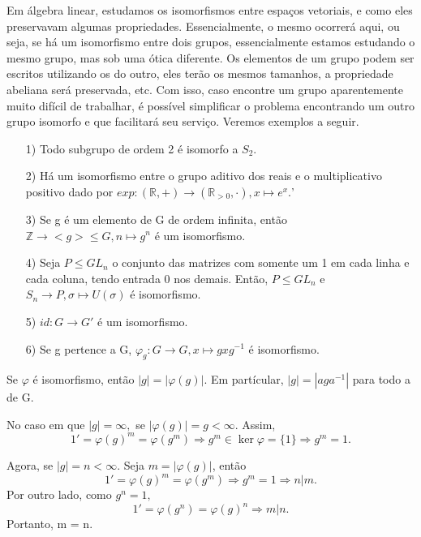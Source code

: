 \documentclass[algebra_notes.tex]{subfiles}
\begin{document}
Em álgebra linear, estudamos os isomorfismos entre espaços vetoriais, e como eles preservavam algumas propriedades. Essencialmente,
o mesmo ocorrerá aqui, ou seja, se há um isomorfismo entre dois grupos, essencialmente estamos estudando o mesmo grupo, mas sob uma ótica diferente.
Os elementos de um grupo podem ser escritos utilizando os do outro, eles terão os mesmos tamanhos, a propriedade abeliana será preservada, etc.
Com isso, caso encontre um grupo aparentemente muito difícil de trabalhar, é possível simplificar o problema encontrando um outro grupo
isomorfo e que facilitará seu serviço. Veremos exemplos a seguir.
\begin{example*}
	\begin{itemize}
		\item[1)] Todo subgrupo de ordem 2 é isomorfo a $S_{2}$.
		\item[2)] Há um isomorfismo entre o grupo aditivo dos reais e o multiplicativo positivo dado por $exp:(\mathbb{R}, +)\rightarrow (\mathbb{R}_{>0}, \cdot), x\mapsto e^{x}.$'
		\item[3)] Se g é um elemento de G de ordem infinita, então $\mathbb{Z}\rightarrow <g>\leq{G}, n\mapsto g^{n}$ é um isomorfismo.
		\item[4)] Seja $P\leq{GL_{n}}$ o conjunto das matrizes com somente um 1 em cada linha e cada coluna, tendo entrada 0 nos demais. Então,
		      $P\leq{GL_{n}}$ e $S_{n}\rightarrow P, \sigma\mapsto U(\sigma)$ é isomorfismo.
		\item[5)] $id:G\rightarrow G'$ é um isomorfismo.
		\item[6)] Se g pertence a G, $\varphi_{g}:G\rightarrow G, x\mapsto gxg^{-1}$ é isomorfismo.
	\end{itemize}
\end{example*}
\begin{prop*}
	Se $\varphi$ é isomorfismo, então $|g| = |\varphi(g)|$. Em partícular, $|g| = |aga^{-1}|$ para todo a de G.
\end{prop*}
\begin{proof*}
	No caso em que $|g| = \infty,$ se $|\varphi(g)| = g < \infty$. Assim,
	$$
		1' = \varphi(g)^{m} = \varphi(g^{m}) \Rightarrow g^{m}\in\ker{\varphi} = \{1\} \Rightarrow g^{m} = 1.
	$$

	Agora, se $|g| = n <\infty$. Seja $m = |\varphi(g)|$, então
	$$
		1' = \varphi(g)^{m} = \varphi(g^{m}) \Rightarrow g^{m} = 1 \Rightarrow n|m.
	$$
	Por outro lado, como $g^{n} = 1,$
	$$
		1' = \varphi(g^{n}) = \varphi(g)^{n} \Rightarrow m|n.
	$$
	Portanto, m = n. \qedsymbol
\end{proof*}
\end{document}
